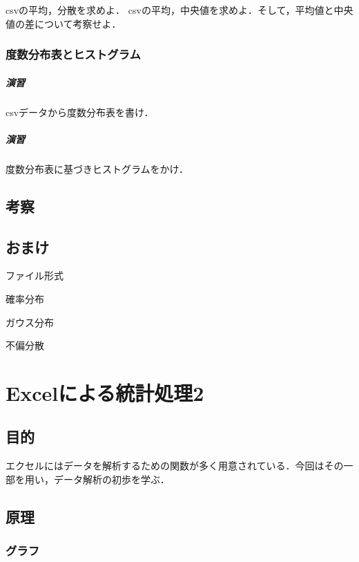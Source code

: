 \documentclass[12pt, a4j]{jreport}
\begin{document}
csvの平均，分散を求めよ．
csvの平均，中央値を求めよ．そして，平均値と中央値の差について考察せよ．



\subsection{度数分布表とヒストグラム}

\paragraph{演習}
csvデータから度数分布表を書け．

\paragraph{演習}
度数分布表に基づきヒストグラムをかけ．



\section{考察}



\section{おまけ}

ファイル形式

確率分布

ガウス分布

不偏分散

\chapter{Excelによる統計処理2}

\section{目的}

エクセルにはデータを解析するための関数が多く用意されている．今回はその一部を用い，データ解析の初歩を学ぶ．

\section{原理}

\subsection{グラフ}
\end{document}
